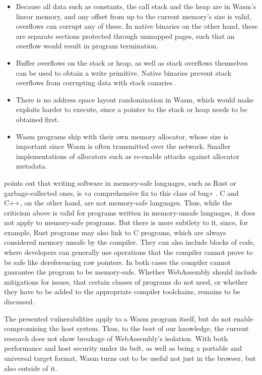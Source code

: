 \begin{itemize}
    \item Because all data such as constants, the call stack and the heap are in Wasm's linear memory, and any offset from up to the current memory's size is valid, overflows can corrupt any of these. In native binaries on the other hand, these are separate sections protected through unmapped pages, such that an overflow would result in program termination.
    \item Buffer overflows on the stack or heap, as well as stack overflows themselves can be used to obtain a write primitive. Native binaries prevent stack overflows from corrupting data with stack canaries \cite{Cowan98}.
    \item There is no address space layout randomization in Wasm, which would make exploits harder to execute, since a pointer to the stack or heap needs to be obtained first.
    \item Wasm programs ship with their own memory allocator, whose size is important since Wasm is often transmitted over the network. Smaller implementations of allocators such as  re-enable attacks against allocator metadata.
\end{itemize}

\citeauthor{Wingo2020} points out that writing software in memory-safe languages, such as Rust or garbage-collected ones, is »a comprehensive fix to this class of bug« \cite{Wingo2020}. C and C++, on the other hand, are not memory-safe languages. Thus, while the criticism above is valid for programs written in memory-unsafe languages, it does not apply to memory-safe programs. But there is more subtlety to it, since, for example, Rust programs may also link to C programs, which are always considered memory unsafe by the compiler. They can also include blocks of  code, where developers can generally use operations that the compiler cannot prove to be safe like dereferencing raw pointers. In both cases the compiler cannot guarantee the program to be memory-safe. Whether WebAssembly should include mitigations for issues, that certain classes of programs do not need, or whether they have to be added to the appropriate compiler toolchains, remains to be discussed.

The presented vulnerabilities apply to a Wasm program itself, but do not enable compromising the host system. Thus, to the best of our knowledge, the current research does not show breakage of WebAssembly's isolation. With both performance and host security under its belt, as well as being a portable and universal target format, Wasm turns out to be useful not just in the browser, but also outside of it.

